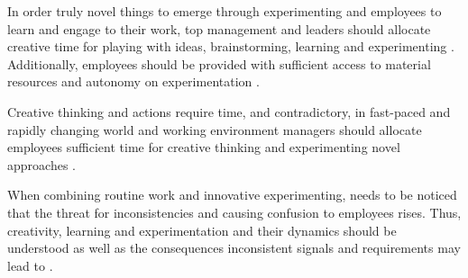 In order truly novel things to emerge through experimenting and employees to learn and engage to their work, top management and leaders should allocate creative time for playing with ideas, brainstorming, learning and experimenting \citep{amabile2002creativity}. Additionally, employees should be provided with sufficient access to material resources \citep{katz1985project} and autonomy on experimentation \citep{shalley2004leaders}. 

Creative thinking and actions require time, and contradictory, in fast-paced and rapidly changing world and working environment managers should allocate employees sufficient time for creative thinking and experimenting novel approaches \citep{shalley2004leaders}.

When combining routine work and innovative experimenting, needs to be noticed that the threat for inconsistencies and causing confusion to employees rises. Thus, creativity, learning and experimentation and their dynamics should be understood as well as the consequences inconsistent signals and requirements may lead to \citep{lee2004mixed}.

